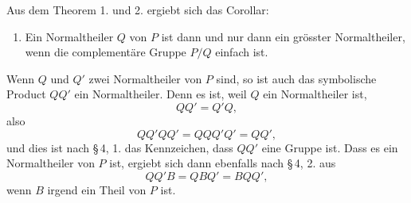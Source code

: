 \documentclass[11pt]{article}
\begin{document}
Aus dem Theorem 1. und 2. ergiebt sich das Corollar:
\begin{enumerate}[resume,label=\arabic*.]
\item Ein Normaltheiler $Q$ von $P$ ist dann und nur dann ein grösster Normaltheiler, wenn die complementäre Gruppe $P/Q$ einfach ist.
\end{enumerate}

Wenn $Q$ und $Q'$ zwei Normaltheiler von $P$ sind, so ist auch das symbolische Product $QQ'$ ein Normaltheiler. Denn es ist, weil $Q$ ein Normaltheiler ist,
\[
QQ'=Q'Q,
\]
also
\[
QQ'QQ'=QQQ'Q'=QQ',
\]
und dies ist nach \S\,4, 1. das Kennzeichen, dass $QQ'$ eine Gruppe ist. Dass es ein Normaltheiler von $P$ ist, ergiebt sich dann ebenfalls nach \S\,4, 2. aus
\[
QQ'B=QBQ'=BQQ',
\]
wenn $B$ irgend ein Theil von $P$ ist.
\end{document}
